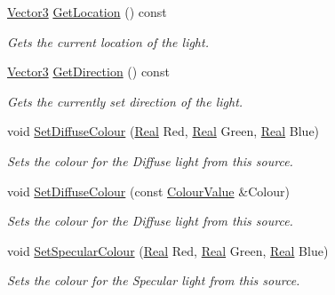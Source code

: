 \begin{DoxyCompactItemize}
\hyperlink{classphys_1_1Vector3}{Vector3} \hyperlink{classphys_1_1Light_ad3610013689db17cb21e89af2786fb3d}{GetLocation} () const 
\begin{DoxyCompactList}\small\item\em Gets the current location of the light. \item\end{DoxyCompactList}\item 
\hyperlink{classphys_1_1Vector3}{Vector3} \hyperlink{classphys_1_1Light_afde81fca535417fdb33d23d38117ccac}{GetDirection} () const 
\begin{DoxyCompactList}\small\item\em Gets the currently set direction of the light. \item\end{DoxyCompactList}\item 
void \hyperlink{classphys_1_1Light_aa54aed6085b348631daa26bc820bb715}{SetDiffuseColour} (\hyperlink{namespacephys_af7eb897198d265b8e868f45240230d5f}{Real} Red, \hyperlink{namespacephys_af7eb897198d265b8e868f45240230d5f}{Real} Green, \hyperlink{namespacephys_af7eb897198d265b8e868f45240230d5f}{Real} Blue)
\begin{DoxyCompactList}\small\item\em Sets the colour for the Diffuse light from this source. \item\end{DoxyCompactList}\item 
void \hyperlink{classphys_1_1Light_a9f7d46ed6a5c70f2c7120acbb756d65a}{SetDiffuseColour} (const \hyperlink{classphys_1_1ColourValue}{ColourValue} \&Colour)
\begin{DoxyCompactList}\small\item\em Sets the colour for the Diffuse light from this source. \item\end{DoxyCompactList}\item 
void \hyperlink{classphys_1_1Light_a6f2f7b5745e455e7281f7c5e76766c1b}{SetSpecularColour} (\hyperlink{namespacephys_af7eb897198d265b8e868f45240230d5f}{Real} Red, \hyperlink{namespacephys_af7eb897198d265b8e868f45240230d5f}{Real} Green, \hyperlink{namespacephys_af7eb897198d265b8e868f45240230d5f}{Real} Blue)
\begin{DoxyCompactList}\small\item\em Sets the colour for the Specular light from this source. \item\end{DoxyCompactList}\item 

\end{DoxyCompactItemize}
